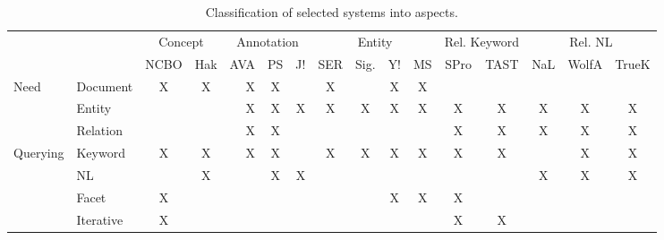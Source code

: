 \begin{table}[htbp]
  \centering
  \caption{Classification of selected systems into aspects.}
    \begin{tabular}{|r|r||c|c|r|c|c|c|c|c|c|c|c|c|c|r|}
    \hline
    \multicolumn{1}{|c}{} & \multicolumn{1}{c||}{} & \multicolumn{2}{c|}{Concept} & \multicolumn{3}{c|}{Annotation}        & \multicolumn{4}{c|}{Entity}   & \multicolumn{2}{c|}{Rel. Keyword} & \multicolumn{3}{c|}{Rel. NL}   \bigstrut\\
\cline{3-16}    \multicolumn{1}{|c}{} & \multicolumn{1}{c||}{} & NCBO  & Hak   & \multicolumn{1}{c|}{AVA} & PS    & J!    & SER   & Sig.  & Y!    & MS    & SPro  & TAST  & NaL   & WolfA & \multicolumn{1}{c|}{TrueK} \bigstrut\\
    \hline
    \hline
    \multicolumn{1}{|l|}{\multirow{3}[6]{*}{Need}} & \multicolumn{1}{l||}{Document} & X     & X     & X     & X     &       & X     &       & X     & X     &       &       &       &       &  \bigstrut\\
\cline{2-16}    \multicolumn{1}{|l|}{} & \multicolumn{1}{l||}{Entity} &       &       & X     & X     & X     & X     & X     & X     & X     & X     & X     & X     & X     & \multicolumn{1}{c|}{X} \bigstrut\\
\cline{2-16}    \multicolumn{1}{|l|}{} & \multicolumn{1}{l||}{Relation} &       &       & X     & X     &       &       &       &       &       & X     & X     & X     & X     & \multicolumn{1}{c|}{X} \bigstrut\\
    \hline
    \multicolumn{1}{|l|}{\multirow{4}[8]{*}{Querying}} & \multicolumn{1}{l||}{Keyword} & X     & X     & X     & X     &       & X     & X     & X     & X     & X     & X     &       & X     & \multicolumn{1}{c|}{X} \bigstrut\\
\cline{2-16}    \multicolumn{1}{|l|}{} & \multicolumn{1}{l||}{NL} &       & X     &       & X     & X     &       &       &       &       &       &       & X     & X     & \multicolumn{1}{c|}{X} \bigstrut\\
\cline{2-16}    \multicolumn{1}{|l|}{} & \multicolumn{1}{l||}{Facet} & X     &       &       &       &       &       &       & X     & X     & X     &       &       &       &  \bigstrut\\
\cline{2-16}    \multicolumn{1}{|l|}{} & \multicolumn{1}{l||}{Iterative} & X     &       &       &       &       &       &       &       &       & X     & X     &       &       &  \bigstrut\\
    \hline

\end{tabular}
\end{table}
